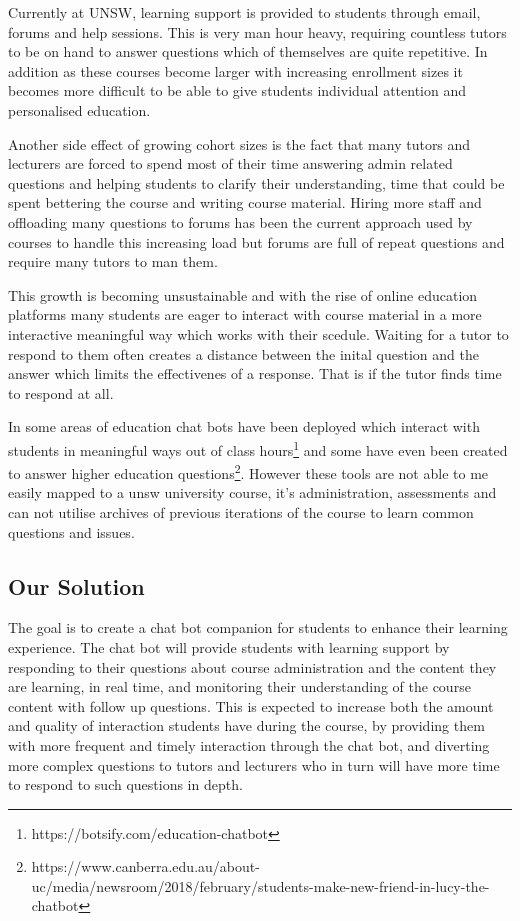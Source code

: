 \documentclass{article}
\begin{document}
Currently at UNSW, learning support is provided to students through email, forums and help sessions. This is very man hour heavy, requiring countless tutors to be on hand to answer questions which of themselves are quite repetitive. In addition as these courses become larger with increasing enrollment sizes it becomes more difficult to be able to give students individual attention and personalised education. 

Another side effect of growing cohort sizes is the fact that many tutors and lecturers are forced to spend most of their time answering admin related questions and helping students to clarify their understanding, time that could be spent bettering the course and writing course material. Hiring more staff and offloading many questions to forums has been the current approach used by courses to handle this increasing load but forums are full of repeat questions and require many tutors to man them. 

This growth is becoming unsustainable and with the rise of online education platforms many students are eager to interact with course material in a more interactive meaningful way which works with their scedule. Waiting for a tutor to respond to them often creates a distance between the inital question and the answer which limits the effectivenes of a response. That is if the tutor finds time to respond at all. 

In some areas of education chat bots have been deployed which interact with students in meaningful ways out of class hours\footnote{https://botsify.com/education-chatbot} and some have even been created to answer higher education questions\footnote{https://www.canberra.edu.au/about-uc/media/newsroom/2018/february/students-make-new-friend-in-lucy-the-chatbot}. However these tools are not able to me easily mapped to a unsw university course, it's administration, assessments and can not utilise archives of previous iterations of the course to learn common questions and issues.


\subsection{Our Solution}

The goal is to create a chat bot companion for students to enhance their learning experience. The chat bot will provide students with learning support by responding to their questions about course administration and the content they are learning, in real time, and monitoring their understanding of the course content with follow up questions. This is expected to increase both the amount and quality of interaction students have during the course, by providing them with more frequent and timely interaction through the chat bot, and diverting more complex questions to tutors and lecturers who in turn will have more time to respond to such questions in depth. 
\end{document}
